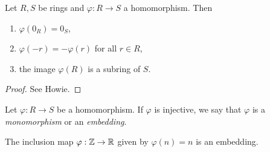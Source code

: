 \begin{tcolorbox}
\begin{theorem}
  Let $R, S$ be rings and $\varphi : R \to S$ a
  homomorphism. Then
  \begin{enumerate}
    \item $\varphi(0_R) = 0_S$,
    \item $\varphi(-r) = -\varphi(r)$ for all $r \in R$,
    \item the image $\varphi(R)$ is a subring of $S$.
  \end{enumerate}
\end{theorem}
\end{tcolorbox}

\begin{proof}
  See Howie.
\end{proof}

\begin{definition}[Monomorphism]
  Let $\varphi : R \to S$ be a homomorphism. If
  $\varphi$ is injective, we say that $\varphi$ is
  a \emph{monomorphism} or an \emph{embedding}.
\end{definition}

\begin{example}
  The inclusion map $\varphi : \mathbb{Z} \to \mathbb{R}$ given by
  $\varphi(n) = n$ is an embedding.
\end{example}
